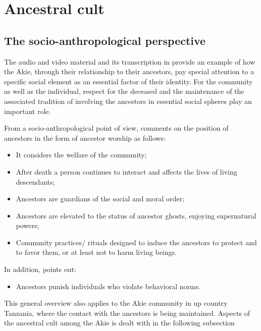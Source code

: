 \documentclass[output=paper,colorlinks,citecolor=brown]{langscibook}
\begin{document}
\section{Ancestral cult}\label{sec:legere:3}

\subsection{The socio-anthropological perspective}\label{sec:legere:3.1}

The audio and video material and its transcription in  provide an example of how the Akie, through their relationship to their ancestors, pay special attention to a specific social element as an essential factor of their identity. For the community as well as the individual, respect for the deceased and the maintenance of the associated tradition of involving the ancestors in essential social spheres play an important role. 

From a socio-anthropological point of view, \cite[364]{Ferraro2005} comments on the position of ancestors in the form of ancestor worship as follows:

\begin{itemize}
    \item It considers the welfare of the community;
    \item After death a person continues to interact and affects the lives of living descendants;
    \item Ancestors are guardians of the social and moral order;
    \item Ancestors are elevated to the status of ancestor ghosts, enjoying supernatural powers;
    \item Community practices/ rituals designed to induce the ancestors to protect and to favor them, or at least not to harm living beings.
\end{itemize}

\noindent In addition, \cite[365]{Ferraro2005} points out: 

\begin{itemize}
    \item Ancestors punish individuals who violate behavioral norms.
\end{itemize}

\noindent This general overview also applies to the Akie community in up country Tanzania, where the contact with the ancestors is being maintained. Aspects of the ancestral cult among the Akie is dealt with in the following subsection
\end{document}
